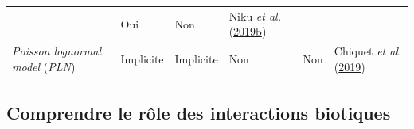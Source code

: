 \documentclass[12pt,]{article}
\begin{document}
{\begin{longtable}[]{@{}llllll@{}}
\begin{minipage}[t]{0.10\columnwidth}
\end{minipage} & \begin{minipage}[t]{0.12\columnwidth}\raggedright
Oui\strut
\end{minipage} & \begin{minipage}[t]{0.07\columnwidth}\raggedright
Non\strut
\end{minipage} & \begin{minipage}[t]{0.10\columnwidth}\raggedright
Niku \emph{et al.}
(\protect\hyperlink{ref-Niku_2019}{2019}\protect\hyperlink{ref-Niku_2019}{b})\strut
\end{minipage}\tabularnewline
\begin{minipage}[t]{0.35\columnwidth}\raggedright
\emph{Poisson lognormal model} (\emph{PLN})\strut
\end{minipage} & \begin{minipage}[t]{0.10\columnwidth}\raggedright
Implicite\strut
\end{minipage} & \begin{minipage}[t]{0.10\columnwidth}\raggedright
Implicite\strut
\end{minipage} & \begin{minipage}[t]{0.12\columnwidth}\raggedright
Non\strut
\end{minipage} & \begin{minipage}[t]{0.07\columnwidth}\raggedright
Non\strut
\end{minipage} & \begin{minipage}[t]{0.10\columnwidth}\raggedright
Chiquet \emph{et al.} (\protect\hyperlink{ref-Chiquet_2019}{2019})\strut
\end{minipage}\tabularnewline
\bottomrule
\end{longtable}}\FloatBarrier


\hypertarget{comprendre-le-ruxf4le-des-interactions-biotiques}{%
\subsection{Comprendre le rôle des interactions
biotiques}\label{comprendre-le-ruxf4le-des-interactions-biotiques}}
\end{document}
